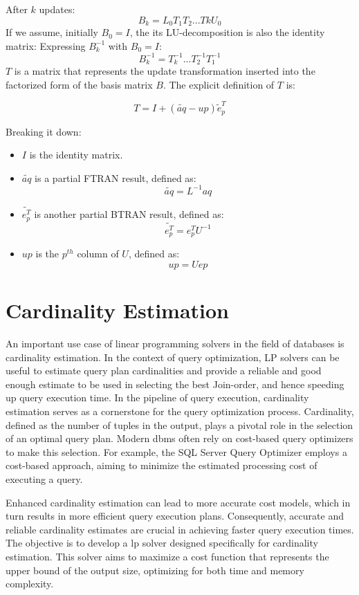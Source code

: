 After \(k\) updates:
\[ B_k = L_0T_1T_2...TkU_0 \]
If we assume, initially \( B_0 = I \), the its LU-decomposition is also the identity
matrix:
Expressing \( B_k^{-1} \) with \( B_0 = I \):
\[ B_k^{-1} = T_k^{-1}...T_2^{-1}T_1^{-1} \]
\( T \) is a matrix that represents the update
transformation inserted into the factorized form of the basis matrix \( B \).
The explicit definition of \( T \) is:

\[ T = I + (\tilde{aq} - up)\tilde{e}^T_p \]

Breaking it down:
\begin{itemize}
    \item \( I \) is the identity matrix.
    \item \( \tilde{aq} \) is a partial FTRAN result, defined as:
          \[ \tilde{aq} = L^{-1}aq \]
    \item \( \tilde{e^T_p} \) is another partial BTRAN result, defined as:
          \[ \tilde{e^T_p} = e^T_p U^{-1} \]
    \item \( up \) is the \( p^{th} \) column of \( U \), defined as:
          \[ up = Uep \]
\end{itemize}


\section{Cardinality Estimation}\label{section:cardinality-estimate}
An important use case of linear programming solvers in the field of databases is
cardinality estimation.
In the context of query optimization, LP solvers can be useful to estimate query plan
cardinalities and provide a reliable and good enough estimate to be used in selecting
the best Join-order, and hence speeding up query execution time.
In the pipeline of query execution, cardinality estimation serves
as a cornerstone for the query optimization process.
Cardinality, defined as the number of tuples in the output,
plays a pivotal role in the selection of an optimal query plan.
Modern \gls{dbms} often rely on
cost-based query optimizers to make this selection.
For example, the SQL Server Query Optimizer
\parencite{microsoft2023cardinality} employs a
cost-based approach, aiming to minimize the estimated
processing cost of executing a query.

Enhanced cardinality estimation
can lead to more accurate cost models, which in turn results
in more efficient query execution plans.
Consequently, accurate and reliable cardinality estimates are
crucial in achieving faster query execution times.
The objective is to develop a \gls{lp}
solver designed specifically for cardinality estimation.
This solver aims to maximize a cost function that represents
the upper bound of the output size, optimizing for both
time and memory complexity.

